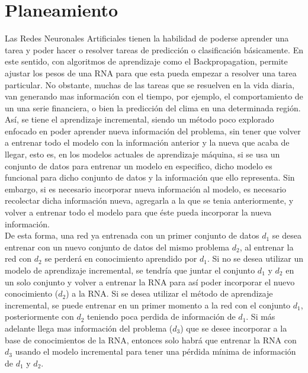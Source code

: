 \section{Planeamiento}
	
	
    Las Redes Neuronales Artificiales tienen la habilidad de poderse aprender una tarea 
    y poder hacer o resolver tareas de predicción o clasificación básicamente. En este 
    sentido, con algoritmos de aprendizaje como el Backpropagation, permite ajustar los 
    pesos de una RNA para que esta pueda empezar a resolver una tarea particular.  No 
    obstante, muchas de las tareas que se resuelven en la vida diaria, van generando mas 
    información con el tiempo, por ejemplo, el comportamiento de un una serie financiera, 
    o bien la predicción del clima en una determinada región. Así,  se tiene el aprendizaje 
    incremental, siendo un método poco explorado  enfocado en poder aprender nueva información del 
    problema, sin tener que volver a entrenar todo el modelo con la información anterior y la 
    nueva que acaba de llegar, esto es, en los modelos actuales de aprendizaje máquina, si se usa 
    un conjunto de datos para entrenar un modelo en especifico, dicho modelo es funcional para 
    dicho conjunto de datos y la información que ello representa. Sin embargo, si es necesario 
    incorporar nueva información al modelo, es necesario recolectar dicha información nueva, 
    agregarla a la que se tenia anteriormente, y volver a entrenar todo el modelo para que \'este 
    pueda incorporar la nueva información.\\

    De esta forma, una red ya entrenada con un primer conjunto de datos $d_{1}$ se desea entrenar 
    con un nuevo conjunto de datos del mismo problema $d_{2}$, al entrenar la red con $d_{2}$ se 
    perderá en conocimiento aprendido por $d_{1}$.  Si no se desea utilizar un modelo de aprendizaje 
    incremental, se tendría que juntar el conjunto $d_{1}$ y $d_{2}$ en un solo conjunto y volver a 
    entrenar la RNA para así poder incorporar el nuevo conocimiento ($d_{2}$) a la RNA. Si se desea 
    utilizar el método de aprendizaje incremental, se puede entrenar en un primer momento a la red 
    con el conjunto $d_{1}$, posteriormente con $d_{2}$ teniendo poca perdida de información de $d_{1}$. 
    Si más adelante llega mas información del problema ($d_{3}$) que se desee incorporar a la base 
    de conocimientos de la RNA, entonces solo habrá que entrenar la RNA con $d_{3}$ usando el modelo 
    incremental para tener una p\'erdida mínima de información de $d_{1}$ y $d_{2}$. \\

